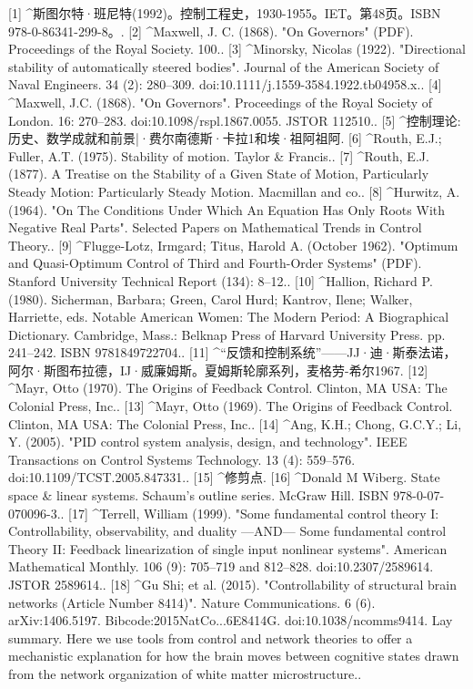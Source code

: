 [1]
^斯图尔特·班尼特(1992)。控制工程史，1930-1955。IET。第48页。ISBN 978-0-86341-299-8。.
[2]
^Maxwell, J. C. (1868). "On Governors" (PDF). Proceedings of the Royal Society. 100..
[3]
^Minorsky, Nicolas (1922). "Directional stability of automatically steered bodies". Journal of the American Society of Naval Engineers. 34 (2): 280–309. doi:10.1111/j.1559-3584.1922.tb04958.x..
[4]
^Maxwell, J.C. (1868). "On Governors". Proceedings of the Royal Society of London. 16: 270–283. doi:10.1098/rspl.1867.0055. JSTOR 112510..
[5]
^控制理论:历史、数学成就和前景|·费尔南德斯·卡拉1和埃·祖阿祖阿.
[6]
^Routh, E.J.; Fuller, A.T. (1975). Stability of motion. Taylor & Francis..
[7]
^Routh, E.J. (1877). A Treatise on the Stability of a Given State of Motion, Particularly Steady Motion: Particularly Steady Motion. Macmillan and co..
[8]
^Hurwitz, A. (1964). "On The Conditions Under Which An Equation Has Only Roots With Negative Real Parts". Selected Papers on Mathematical Trends in Control Theory..
[9]
^Flugge-Lotz, Irmgard; Titus, Harold A. (October 1962). "Optimum and Quasi-Optimum Control of Third and Fourth-Order Systems" (PDF). Stanford University Technical Report (134): 8–12..
[10]
^Hallion, Richard P. (1980). Sicherman, Barbara; Green, Carol Hurd; Kantrov, Ilene; Walker, Harriette, eds. Notable American Women: The Modern Period: A Biographical Dictionary. Cambridge, Mass.: Belknap Press of Harvard University Press. pp. 241–242. ISBN 9781849722704..
[11]
^“反馈和控制系统”——JJ·迪·斯泰法诺，阿尔·斯图布拉德，IJ·威廉姆斯。夏姆斯轮廓系列，麦格劳-希尔1967.
[12]
^Mayr, Otto (1970). The Origins of Feedback Control. Clinton, MA USA: The Colonial Press, Inc..
[13]
^Mayr, Otto (1969). The Origins of Feedback Control. Clinton, MA USA: The Colonial Press, Inc..
[14]
^Ang, K.H.; Chong, G.C.Y.; Li, Y. (2005). "PID control system analysis, design, and technology". IEEE Transactions on Control Systems Technology. 13 (4): 559–576. doi:10.1109/TCST.2005.847331..
[15]
^修剪点.
[16]
^Donald M Wiberg. State space & linear systems. Schaum's outline series. McGraw Hill. ISBN 978-0-07-070096-3..
[17]
^Terrell, William (1999). "Some fundamental control theory I: Controllability, observability, and duality —AND— Some fundamental control Theory II: Feedback linearization of single input nonlinear systems". American Mathematical Monthly. 106 (9): 705–719 and 812–828. doi:10.2307/2589614. JSTOR 2589614..
[18]
^Gu Shi; et al. (2015). "Controllability of structural brain networks (Article Number 8414)". Nature Communications. 6 (6). arXiv:1406.5197. Bibcode:2015NatCo...6E8414G. doi:10.1038/ncomms9414. Lay summary. Here we use tools from control and network theories to offer a mechanistic explanation for how the brain moves between cognitive states drawn from the network organization of white matter microstructure..
